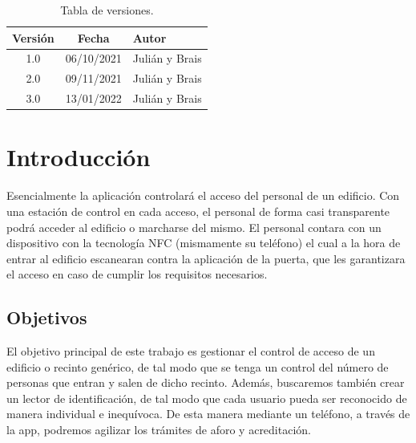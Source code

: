 \documentclass[a4paper,openright,12pt]{article}
\begin{document}


\tableofcontents

\vspace{3cm}

\begin{flushright}
\begin{table}[hbtp]
\begin{center}

\caption{Tabla de versiones.}
\label{tabla:versiones}
\small
\vspace{1ex}

\begin{tabular}{|c|c|l|}
    \hline
    Versión & Fecha & Autor \\
    \hline \hline
    1.0 & 06/10/2021 & Julián y Brais\\ \hline
    2.0 & 09/11/2021 & Julián y Brais\\ \hline
    3.0 & 13/01/2022 & Julián y Brais\\ \hline
\end{tabular}

\end{center}
\end{table}
\end{flushright}
\newpage
{}

\section{Introducción}\label{cap.introduccion}
Esencialmente la aplicación controlará el acceso del personal de un edificio. Con una estación de control en cada acceso, el personal de forma casi transparente podrá acceder al edificio o marcharse del mismo.
El personal contara con un dispositivo con la tecnología NFC (mismamente su teléfono) el cual a la hora de entrar al edificio escanearan contra la aplicación de la puerta, que les garantizara el acceso en caso de cumplir los requisitos necesarios.

\subsection{Objetivos}
El objetivo principal de este trabajo es gestionar el control de acceso de un edificio o recinto genérico, de tal modo que se tenga un control del número de personas que entran y salen de dicho recinto. Además, buscaremos también crear un lector de identificación, de tal modo que cada usuario pueda ser reconocido de manera individual e inequívoca. De esta manera mediante un teléfono, a través de la app, podremos agilizar los trámites de aforo y acreditación.
\end{document}
